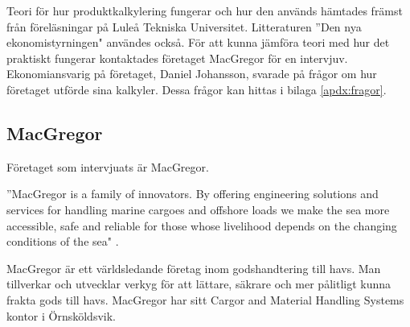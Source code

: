Teori för hur produktkalkylering fungerar och hur den används hämtades främst från föreläsningar på Luleå Tekniska Universitet.
Litteraturen ''Den nya ekonomistyrningen" \cite{dne} användes också.
För att kunna jämföra teori med hur det praktiskt fungerar kontaktades företaget MacGregor för en intervjuv.
Ekonomiansvarig på företaget, Daniel Johansson, svarade på frågor om hur företaget utförde sina kalkyler.
Dessa frågor kan hittas i bilaga \ref{apdx:fragor}.

%
%

\subsection{MacGregor}
Företaget som intervjuats är MacGregor.

''MacGregor is a family of innovators. By offering engineering solutions and services for handling marine cargoes and offshore loads we make the sea more accessible, safe and reliable for those whose livelihood depends on the changing conditions of the sea" \cite{macgregor}.

MacGregor är ett världsledande företag inom godshandtering till havs. 
Man tillverkar och utvecklar verkyg för att lättare, säkrare och mer pålitligt kunna frakta gods till havs.
MacGregor har sitt Cargor and Material Handling Systems kontor i Örnsköldsvik. 

%
%

